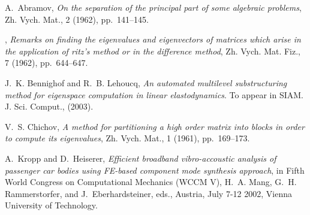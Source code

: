 \documentclass{report}
\begin{document}

\begin{thebibliography}{10}

{\sc A.~Abramov}, {\em On the separation of the principal part of some
algebraic problems}, Zh. Vych. Mat., 2 (1962), pp.~141--145.

\leavevmode\vrule height 2pt depth -1.6pt width 23pt, {\em Remarks on
finding the eigenvalues and eigenvectors of matrices which arise in the
application of ritz's method or in the difference method}, Zh. Vych. Mat.
Fiz., 7 (1962), pp.~644--647.

{\sc J.~K. Bennighof and R.~B. Lehoucq}, {\em An automated multilevel
substructuring method for eigenspace computation in linear
elastodynamics}. To appear in SIAM. J. Sci. Comput., (2003).

 {\sc V.~S. Chichov}, {\em A method for partitioning a
high order matrix into blocks in order to compute its eigenvalues}, Zh.
Vych. Mat., 1 (1961), pp.~169--173.


{\sc A.~Kropp and D.~Heiserer}, {\em Efficient broadband vibro-accoustic
analysis of passenger car bodies using {FE}-based component mode
synthesis approach}, in Fifth World Congress on Computational Mechanics
(WCCM V), H.~A. Mang, G.~H. Rammerstorfer, and J.~Eberhardsteiner, eds.,
Austria, July 7-12
2002, Vienna University of Technology.




\end{thebibliography}
\end{document}
